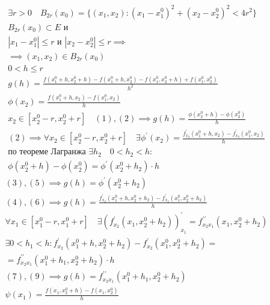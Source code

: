 \documentclass[main]{subfiles}
\begin{document}
        \begin{longProof}
            \begin{gather*}
                \exists r > 0 \quad B_{2r}(x_0) = \{ (x_1,x_2) : (x_1-x_1^0)^2 + (x_2-x_2^0)^2 < 4r^2 \} \\
                B_{2r}(x_0) \subset E \text{ и } \\
                 |x_1 - x_1^0| \leq r \text{ и } |x_2-x_2^0| \leq r \implies \\
                \implies (x_1,x_2) \in B_{2r}(x_0) \\
                0 < h \leq r \\
                g(h) = \frac{f(x_1^0+h,x_2^0+h)-f(x_1^0+h,x_2^0) - f(x_1^0,x_2^0+h) + f(x_1^0,x_2^0)}{h^2} \tag{1}\\
                \phi(x_2) = \frac{f(x_1^0+h,x_2) - f(x_1^0,x_2)}{h} \tag{2}\\
                x_2 \in [x_2^0-r, x_2^0+r]  \quad (1),(2) \implies g(h) = \frac{\phi(x_2^0+h)-\phi(x_2^0)}{h} \tag{3} \\
                (2) \implies \forall x_2 \in [x^0_2 - r, x^0_2 + r] \quad \exists \phi^\prime(x_2) = \frac{f^\prime_{x_2}(x_1^0+h,x_2)-f^\prime_{x_2}(x_1^0,x_2)}{h} \tag{4}\\
                \text{по теореме Лагранжа } \exists h_2 \quad 0 < h_2 < h : \\
                \phi(x_2^0+h) - \phi(x_2^0) = \phi^\prime(x_2^0+h_2) \cdot h \tag{5}
            \end{gather*}
            \begin{gather*}
                (3),(5) \implies g(h) = \phi^\prime(x_2^0 + h_2) \tag{6}\\
                (4),(6) \implies g(h) = \frac{f^\prime_{x_2}(x_1^0+h,x_2^0+h_2)-f^\prime_{x_2}(x_1^0,x^0_2 + h_2)}{h} \tag{7}\\
                \forall x_1 \in [x_1^0-r,x_1^0+r] \quad \exists (f^\prime_{x_2}(x_1,x_2^0+h_2))^\prime_{x_1} = f^{\prime\prime}_{x_2x_1}(x_1,x_2^0+h_2) \tag{8}\\
                \exists 0 < h_1 < h : f^\prime_{x_2}(x_1^0+h,x_2^0+h_2) - f^\prime_{x_2}(x_1^0,x_2^0+h_2) =\\=
                f^{\prime\prime}_{x_2x_1}(x_1^0 + h_1, x_2^0 + h_2) \cdot h \tag{9}\\
                (7),(9) \implies g(h) = f^{\prime\prime}_{x_2x_1}(x_1^0+h_1,x_2^0 + h_2) \tag{10}\\
                \psi(x_1) = \frac{f(x_1,x_2^0+h)-f(x_1,x_2^0)}{h} \tag{11}

\end{gather*}
\end{longProof}
\end{document}
